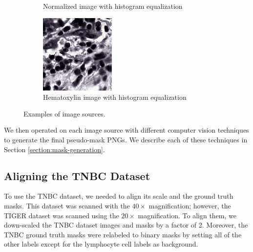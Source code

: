 \begin{figure}[H]
\begin{subfigure}[b]{0.32\textwidth}
    \caption{Normalized image with histogram equalization}\label{fig:tiger-norm-eq}
  \end{subfigure}\hfill
  \begin{subfigure}[b]{0.32\textwidth}
    \centering
    \includegraphics[width=\linewidth]{assets/images/for_presentation/hem_eq_TCGA-EW-A1P8-01Z-00-DX1.E9852193-8CDD-49EF-B49B-DA6931198F0D_[8391, 13690, 8532, 13838].png}
    \caption{Hematoxylin image with histogram equalization}\label{fig:tiger-hem-eq}
  \end{subfigure}
  \caption{Examples of image sources.}
  \label{fig:tiger-sources}
\end{figure}


We then operated on each image source with different computer vision techniques to generate the final pseudo-mask PNGs. We describe each of these techniques in Section \ref{section:mask-generation}. 

\subsection{Aligning the TNBC Dataset} 
To use the TNBC dataset, we needed to align its scale and the ground truth masks. This dataset was scanned with the $40\!\times\!$ magnification; however, the TIGER dataset was scanned using the $20\!\times\!$ magnification. To align them, we down-scaled the TNBC dataset images and masks by a factor of 2. Moreover, the TNBC ground truth masks were relabeled to binary masks by setting all of the other labels except for the lymphocyte cell labels as background.

